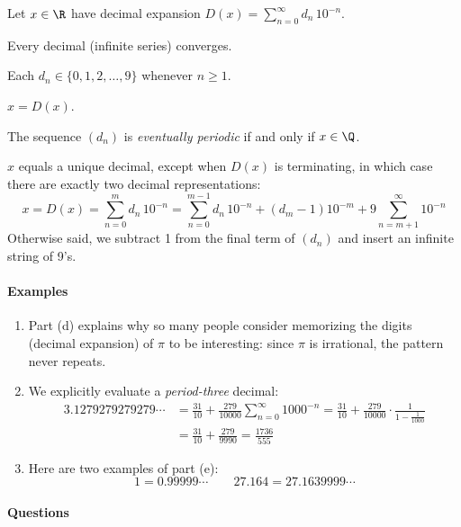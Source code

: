 \begin{thm*}
Let $x\in\R$ have decimal expansion $D(x)=\sum\limits_{n=0}^\infty d_n\,10^{-n}$.
\begin{enumeratea}
  \item Every decimal (infinite series) converges.
  \item Each $d_n\in\{0,1,2,\ldots,9\}$ whenever $n\ge 1$.
  \item $x=D(x)$.
  \item The sequence $(d_n)$ is \emph{eventually periodic} if and only if $x\in\Q$.
  \item $x$ equals a unique decimal, except when $D(x)$ is terminating, in which case there are exactly two decimal representations:
  \[x=D(x)=\sum_{n=0}^md_n\,10^{-n}=\sum_{n=0}^{m-1}d_n\,10^{-n}+(d_m-1)10^{-m}+9\sum_{n=m+1}^\infty 10^{-n}\]
  Otherwise said, we subtract 1 from the final term of $(d_n)$ and insert an infinite string of 9's.
\end{enumeratea}
\end{thm*}

\paragraph{Examples}

\begin{enumerate}
  \item Part (d) explains why so many people consider memorizing the digits (decimal expansion) of $\pi$ to be interesting: since $\pi$ is irrational, the pattern never repeats. 
  \item We explicitly evaluate a \emph{period-three} decimal:
  \begin{align*}
  3.1279279279279\cdots&=\frac{31}{10}+\frac{279}{10000}\sum_{n=0}^\infty 1000^{-n}=\frac{31}{10}+\frac{279}{10000}\cdot\frac 1{1-\frac 1{1000}}\\
  &=\frac{31}{10}+\frac{279}{9990} =\frac{1736}{555}
  \end{align*}
  \item Here are two examples of part (e): 
  \[1=0.99999\cdots\qquad 27.164=27.1639999\cdots\]
\end{enumerate}

\paragraph{Questions}

